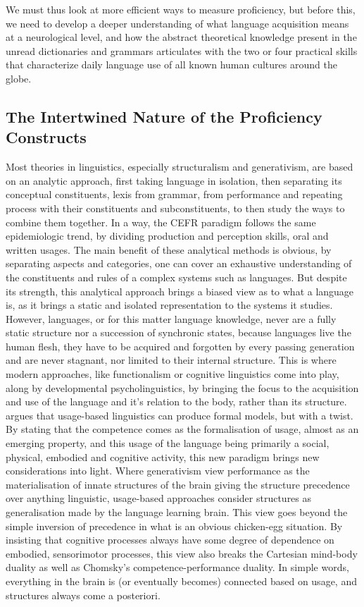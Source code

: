We must thus look at more efficient ways to measure proficiency, but before this, we need to develop a deeper understanding of what language acquisition means at a neurological level, and how the abstract theoretical knowledge present in the unread dictionaries and grammars articulates with the two or four practical skills that characterize daily language use of all known human cultures around the globe.\\

    \subsection{The Intertwined Nature of the Proficiency Constructs}
Most theories in linguistics, especially structuralism and generativism, are based on an analytic approach, first taking language in isolation, then separating its conceptual constituents, lexis from grammar, from performance \parencite{chomsky_aspects_1965} and repeating process with their constituents and subconstituents, to then study the ways to combine them together. In a way, the CEFR paradigm follows the same epidemiologic trend, by dividing production and perception skills, oral and written usages. The main benefit of these analytical methods is obvious, by separating aspects and categories, one can cover an exhaustive understanding of the constituents and rules of a complex systems such as languages. But despite its strength, this analytical approach brings a biased view as to what a language is, as it brings a static and isolated representation to the systems it studies. However, languages, or for this matter language knowledge, never are a fully static structure nor a succession of synchronic states, because languages live the human flesh, they have to be acquired and forgotten by every passing generation and are never stagnant, nor limited to their internal structure. This is where modern approaches, like functionalism or cognitive linguistics \textcite{evans_cognitive_2009} come into play, along by developmental psycholinguistics, by bringing the focus to the acquisition and use of the language and it's relation to the body, rather than its structure. \textcite{bybee_usage-based_1999} argues that usage-based linguistics can produce formal models, but with a twist. By stating that the competence comes as the formalisation of usage, almost as an emerging property, and this usage of the language being primarily a social, physical, embodied and cognitive activity, this new paradigm brings new considerations into light. Where generativism view performance as the materialisation of innate structures of the brain giving the structure precedence over anything linguistic, usage-based approaches consider structures as generalisation made by the language learning brain. This view goes beyond the simple inversion of precedence in what is an obvious chicken-egg situation. By insisting that cognitive processes always have some degree of dependence on embodied, sensorimotor processes, this view also breaks the Cartesian mind-body duality \parencite{varela_embodied_1991} as well as Chomsky's competence-performance duality. In simple words, everything in the brain is (or eventually becomes) connected based on usage, and structures always come a posteriori.\\
